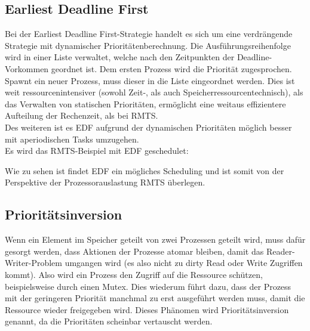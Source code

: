 \subsection{Earliest Deadline First}
Bei der Earliest Deadline First-Strategie handelt es sich um eine verdrängende Strategie mit dynamischer 
Prioritätenberechnung. Die Ausführungsreihenfolge wird in einer Liste verwaltet, welche nach den 
Zeitpunkten der Deadline-Vorkommen geordnet ist. Dem ersten Prozess wird die Priorität zugesprochen. Spawnt 
ein neuer Prozess, muss dieser in die Liste eingeordnet werden. Dies ist weit ressourcenintensiver (sowohl 
Zeit-, als auch Speicherressourcentechnisch), als das Verwalten von statischen Prioritäten, ermöglicht eine 
weitaus effizientere Aufteilung der Rechenzeit, als bei RMTS. \\
Des weiteren ist es EDF aufgrund der dynamischen Prioritäten möglich besser mit aperiodischen Tasks 
umzugehen. \\
Es wird das RMTS-Beispiel mit EDF geschedulet: \\
\begin{center}
\begin{blockgraph}{25}{1}{0.4}
    
\end{blockgraph}
\end{center}
Wie zu sehen ist findet EDF ein mögliches Scheduling und ist somit von der Perspektive der 
Prozessorauslastung RMTS überlegen.

\subsection{Prioritätsinversion}
Wenn ein Element im Speicher geteilt von zwei Prozessen geteilt wird, muss dafür gesorgt werden, dass 
Aktionen der Prozesse atomar bleiben, damit das Reader-Writer-Problem umgangen wird (es also nicht zu dirty 
Read oder Write Zugriffen kommt). Also wird ein Prozess den Zugriff auf die Ressource schützen, 
beispielsweise durch einen Mutex. Dies wiederum führt dazu, dass der Prozess mit der geringeren Priorität 
manchmal zu erst ausgeführt werden muss, damit die Ressource wieder freigegeben wird. Dieses Phänomen wird 
Prioritätsinversion genannt, da die Prioritäten scheinbar vertauscht werden. \\


